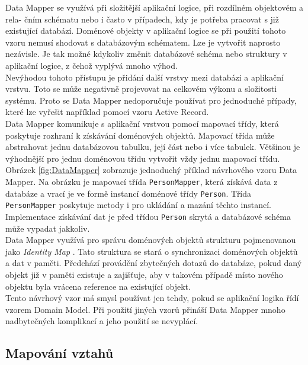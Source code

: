 \documentclass[ing,male,java,dept456]{diploma}						%
\begin{document}
Data Mapper se využívá při složitější aplikační logice, při rozdílném objektovém a rela- čním schématu nebo i často v případech, kdy je potřeba pracovat s již existující databází. Doménové objekty v aplikační logice se při použití tohoto vzoru nemusí shodovat s databázovým schématem. Lze je vytvořit naprosto nezávisle. Je tak možné kdykoliv změnit databázové schéma nebo struktury v aplikační logice, z čehož vyplývá mnoho výhod. \\
Nevýhodou tohoto přístupu je přidání další vrstvy mezi databázi a aplikační vrstvu. Toto se může negativně projevovat na celkovém výkonu a složitosti systému. Proto se Data Mapper nedoporučuje používat pro jednoduché případy, které lze vyřešit například pomocí vzoru Active Record.\\
Data Mapper komunikuje s aplikační vrstvou pomocí mapovací třídy, která poskytuje rozhraní k získávání doménových objektů. Mapovací třída může abstrahovat jednu databázovou tabulku, její část nebo i více tabulek. Většinou je výhodnější pro jednu doménovou třídu vytvořit vždy jednu mapovací třídu. \\
Obrázek \ref{fig:DataMapper} zobrazuje jednoduchý příklad návrhového vzoru Data Mapper. Na obrázku je  mapovací třída \lstinline[style=inlinepython]|PersonMapper|, která získává data z databáze a vrací je ve formě instancí doménové třídy \lstinline[style=inlinepython]|Person|. Třída \lstinline[style=inlinepython]|PersonMapper| poskytuje metody i pro ukládání a mazání těchto instancí. Implementace získávání dat je před třídou \lstinline[style=inlinepython]|Person| skrytá a databázové schéma může vypadat jakkoliv. \\
Data Mapper využívá pro správu doménových objektů strukturu pojmenovanou jako \textit{Identity Map} \cite{fowler}. Tato struktura se stará o synchronizaci doménových objektů a dat v paměti. Předchází provádění zbytečných dotazů do databáze, pokud daný objekt již v paměti existuje a zajišťuje, aby v takovém případě místo nového objektu byla vrácena reference na existující objekt. \\
Tento návrhový vzor má smysl používat jen tehdy, pokud se aplikační logika řídí vzorem Domain Model. Při použití jiných vzorů přináší Data Mapper mnoho nadbytečných komplikací a jeho použití se nevyplácí. \\


\subsection{Mapování vztahů}
\label{subsec:Relmapping}
\end{document}
